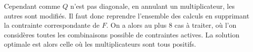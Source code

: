 Cependant comme $Q$ n'est pas diagonale, en annulant un multiplicateur, les autres sont modifiés.  Il faut donc reprendre l'ensemble des calculs en supprimant la contrainte correspondante de $F$. On a alors au plus 8 cas à traiter, où l'on considères toutes les combinaisons possible de contraintes actives. La solution optimale est alors celle où les multiplicateurs sont tous positifs.





